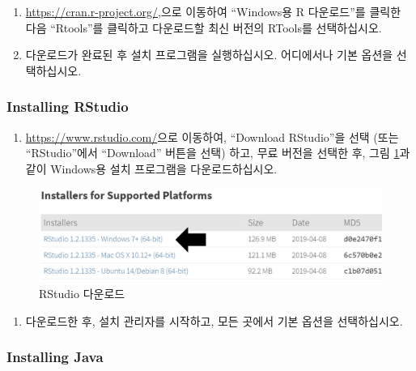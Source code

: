 \documentclass[11pt]{book}
\providecommand{\tightlist}{%
  \setlength{\itemsep}{0pt}\setlength{\parskip}{0pt}}
\theoremstyle{definition}
\theoremstyle{definition}
\theoremstyle{definition}
\theoremstyle{remark}
\begin{document}
\begin{enumerate}
\def\labelenumi{\arabic{enumi}.}
\item
  \url{https://cran.r-project.org/},으로 이동하여 ``Windows용 R
  다운로드''를 클릭한 다음 ``Rtools''를 클릭하고 다운로드할 최신 버전의
  RTools를 선택하십시오.
\item
  다운로드가 완료된 후 설치 프로그램을 실행하십시오. 어디에서나 기본
  옵션을 선택하십시오.
\end{enumerate}

\subsubsection*{Installing RStudio}\label{installing-rstudio}

\begin{enumerate}
\def\labelenumi{\arabic{enumi}.}
\tightlist
\item
  \url{https://www.rstudio.com/}으로 이동하여, ``Download RStudio''을
  선택 (또는 ``RStudio''에서 ``Download'' 버튼을 선택) 하고, 무료 버전을
  선택한 후, 그림 \ref{fig:downloadRStudio}과 같이 Windows용 설치
  프로그램을 다운로드하십시오.
\end{enumerate}

\begin{figure}

{\centering \includegraphics[width=1\linewidth]{images/OhdsiAnalyticsTools/downloadRStudio} 

}

\caption{RStudio 다운로드}\label{fig:downloadRStudio}
\end{figure}

\begin{enumerate}
\def\labelenumi{\arabic{enumi}.}
\setcounter{enumi}{1}
\tightlist
\item
  다운로드한 후, 설치 관리자를 시작하고, 모든 곳에서 기본 옵션을
  선택하십시오.
\end{enumerate}

\subsubsection*{Installing Java}\label{installing-java}
\end{document}
